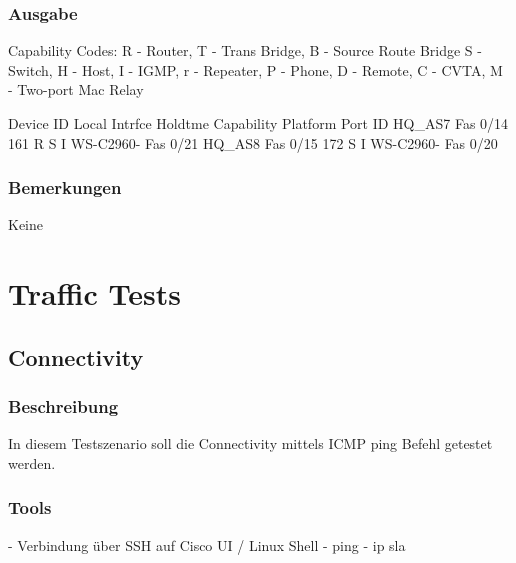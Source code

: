 \documentclass[a4,12pt]{scrartcl}
\begin{document}
\subsubsection{Ausgabe}
Capability Codes: R - Router, T - Trans Bridge, B - Source Route Bridge\newline
                  S - Switch, H - Host, I - IGMP, r - Repeater, P - Phone,\newline
                  D - Remote, C - CVTA, M - Two-port Mac Relay\newline

Device ID        Local Intrfce     Holdtme    Capability  Platform  Port ID\newline
HQ_AS7           Fas 0/14          161             R S I  WS-C2960- Fas 0/21\newline
HQ_AS8           Fas 0/15          172              S I   WS-C2960- Fas 0/20\newline
\subsubsection{Bemerkungen}
Keine



































\newpage
\section{Traffic Tests}
\subsection{Connectivity}
\subsubsection{Beschreibung}
In diesem Testszenario soll die Connectivity mittels ICMP ping Befehl getestet werden.
\subsubsection{Tools}
- Verbindung über SSH auf Cisco UI / Linux Shell
- ping
- ip sla
\end{document}
